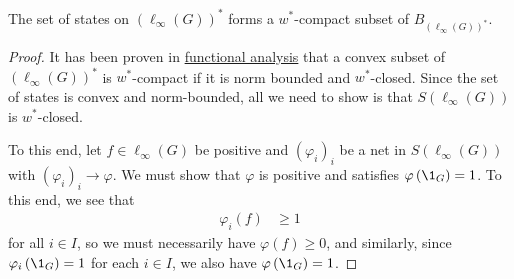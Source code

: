 \documentclass[10pt]{mypackage}
\begin{document}
\begin{corollary}
  The set of states on $\left(\ell_{\infty}\left(G\right)\right)^{\ast}$ forms a $w^{\ast}$-compact subset of $B_{\left(\ell_{\infty}\left(G\right)\right)^{\ast}}$.
\end{corollary}
\begin{proof}
  It has been proven in \href{https://blog.avinashiyer.xyz/Classes_and_Homework/College/Y4/Honors%20Thesis/topological_vector_spaces.pdf}{functional analysis} that a convex subset of $\left(\ell_{\infty}\left(G\right)\right)^{\ast}$ is $w^{\ast}$-compact if it is norm bounded and $w^{\ast}$-closed. Since the set of states is convex and norm-bounded, all we need to show is that $S\left(\ell_{\infty}\left(G\right)\right)$ is $w^{\ast}$-closed.\newline

    To this end, let $f\in \ell_{\infty}(G)$ be positive and $\left(\varphi_i\right)_i$ be a net in $S\left(\ell_{\infty}\left(G\right)\right)$ with $\left(\varphi_i\right)_i\rightarrow \varphi$. We must show that $\varphi$ is positive and satisfies $\varphi\left(\1_{G}\right) = 1$. To this end, we see that
    \begin{align*}
      \varphi_i\left(f\right) &\geq 1
    \end{align*}
    for all $i\in I$, so we must necessarily have $\varphi\left(f\right) \geq 0$, and similarly, since $\varphi_i\left(\1_{G}\right) = 1$ for each $i\in I$, we also have $\varphi\left(\1_G\right) = 1$.
\end{proof}
\end{document}
